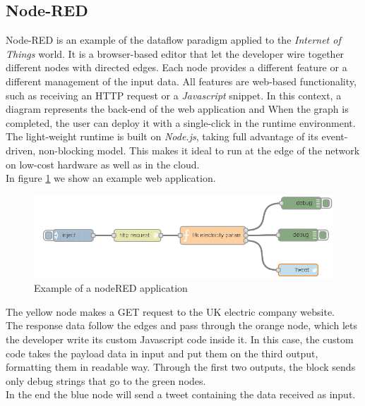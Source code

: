 \subsection{Node-RED}

Node-RED is an example of the dataflow paradigm applied to the \textit{Internet of Things} world.
It is a browser-based editor that let the developer wire together different nodes with directed edges.
Each node provides a different feature or a different management of the input data.
All features are web-based functionality, such as receiving an HTTP request or a \textit{Javascript} snippet.
In this context, a diagram represents the back-end of the web application and When the graph is completed, the user can deploy it with a single-click in the runtime environment.
\\

The light-weight runtime is built on \textit{Node.js}, taking full advantage of its event-driven, non-blocking model. This makes it ideal to run at the edge of the network on low-cost hardware as well as in the cloud.
\\

In figure \ref{fig:nodeRed} we show an example web application.
\\

 \begin{figure}[htbp]
   \centering
   \includegraphics[width=\linewidth]{pictures/nodeRed.png}
   \caption{Example of a nodeRED application}
   \label{fig:nodeRed}
 \end{figure}

The yellow node makes a GET request to the UK electric company website.
\\
The response data follow the edges and pass through the orange node, which lets the developer write its custom Javascript code inside it. 
In this case, the custom code takes the payload data in input and put them on the third output, formatting them in readable way. 
Through the first two outputs, the block sends only debug strings that go to the green nodes.
\\
In the end the blue node will send a tweet containing the data received as input.
\\



